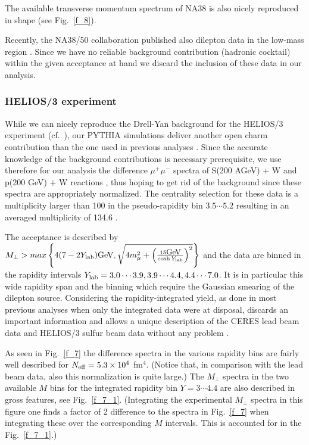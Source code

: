 The available transverse momentum spectrum of NA38 is also nicely reproduced
in shape (see Fig.~\ref{f_8}). 

Recently, the NA38/50 collaboration published also dilepton data in the
low-mass region \cite{NA38/50}. 
Since we have no reliable background contribution
(hadronic cocktail) within the given acceptance 
at hand we discard the inclusion of these data in our analysis. 

\subsubsection{HELIOS/3 experiment} %

While we can nicely reproduce the Drell-Yan background for the 
HELIOS/3 experiment (cf.\ \cite{HELIOS-3}),
our PYTHIA simulations deliver another open charm contribution 
than the one used
in previous analyses \cite{LiGale}. 
Since the accurate knowledge of the background
contributions is necessary prerequisite, we use therefore for our analysis the
difference $\mu^+ \mu^-$ spectra of S(200 AGeV) + W and p(200 GeV) + W 
reactions 
\cite{HELIOS-3},
thus hoping to get rid of the background since these 
spectra are appropriately normalized. 
The centrality selection for these data is a multiplicity larger than
100 in the pseudo-rapidity bin $3.5 \cdots 5.2$ resulting in an
averaged multiplicity of 134.6 \cite{HELIOS-3}.

The acceptance is described by 
$M_\perp > max \left\{4 ( 7 - 2 Y_{\rm lab}) \mbox{GeV},
\sqrt{4 m_\mu^2 + 
\left( \frac{15 {\mbox{{\small GeV}}}}{\cosh Y_{\rm lab}} 
\right)^2} \right\}$
and the data are binned in the rapidity intervals
$Y_{\rm lab} = 3.0 \cdots 3.9, 3.9 \cdots 4.4, 4.4 \cdots 7.0$.
It is in particular this wide rapidity span and the binning which
require the Gaussian smearing of the dilepton source.
Considering the rapidity-integrated yield, as done in most
previous analyses when only the integrated data were at disposal, 
discards an important information
and allows a unique description of the CERES lead beam data and HELIOS/3 
sulfur beam data without any problem \cite{Cassing_2}.

As seen in Fig.~\ref{f_7} the difference spectra in the various
rapidity bins
are fairly well described for $N_{\rm eff} = 5.3 \times 10^4$
fm${}^4$. (Notice that, in comparison with the lead beam data,
also this normalization is quite large.)
The $M_\perp$ spectra in the two available $M$ bins for the
integrated rapidity bin $Y = 3 \cdots 4.4$ are also
described in gross features, see Fig.~\ref{f_7_1}. 
(Integrating the experimental $M_\perp$ spectra in this figure
one finds a factor of 2 difference to the spectra in Fig.~\ref{f_7}
when integrating these over the corresponding $M$ intervals.
This is accounted for in the Fig.~\ref{f_7_1}.) 

